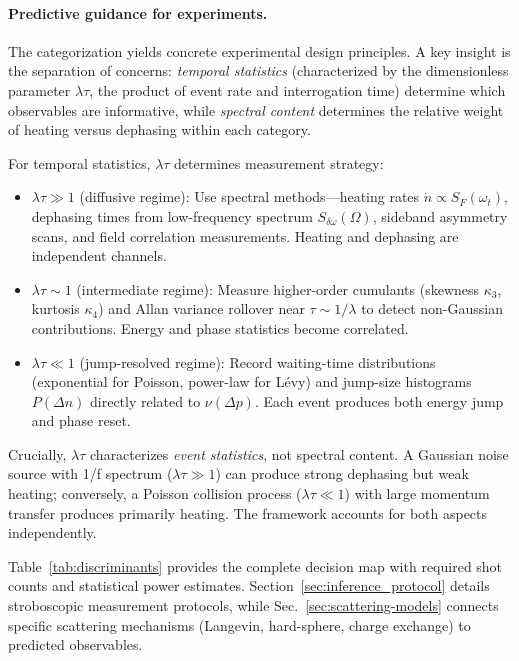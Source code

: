 \paragraph{Predictive guidance for experiments.}
The categorization yields concrete experimental design principles. A key insight is the separation of concerns: \emph{temporal statistics} (characterized by the dimensionless parameter $\lambda\tau$, the product of event rate and interrogation time) determine which observables are informative, while \emph{spectral content} determines the relative weight of heating versus dephasing within each category.

For temporal statistics, $\lambda\tau$ determines measurement strategy:
\begin{itemize}[leftmargin=*,nosep]
\item $\lambda\tau \gg 1$ (diffusive regime): Use spectral methods—heating rates $\dot{n} \propto S_F(\omega_t)$, dephasing times from low-frequency spectrum $S_{\delta\omega}(\Omega)$, sideband asymmetry scans, and field correlation measurements. Heating and dephasing are independent channels.

\item $\lambda\tau \sim 1$ (intermediate regime): Measure higher-order cumulants (skewness $\kappa_3$, kurtosis $\kappa_4$) and Allan variance rollover near $\tau \sim 1/\lambda$ to detect non-Gaussian contributions. Energy and phase statistics become correlated.

\item $\lambda\tau \ll 1$ (jump-resolved regime): Record waiting-time distributions (exponential for Poisson, power-law for L\'evy) and jump-size histograms $P(\Delta n)$ directly related to $\nu(\Delta p)$. Each event produces both energy jump and phase reset.
\end{itemize}

Crucially, $\lambda\tau$ characterizes \emph{event statistics}, not spectral content. A Gaussian noise source with 1/f spectrum ($\lambda\tau \gg 1$) can produce strong dephasing but weak heating; conversely, a Poisson collision process ($\lambda\tau \ll 1$) with large momentum transfer produces primarily heating. The framework accounts for both aspects independently.

Table~\ref{tab:discriminants} provides the complete decision map with required shot counts and statistical power estimates. Section~\ref{sec:inference_protocol} details stroboscopic measurement protocols, while Sec.~\ref{sec:scattering-models} connects specific scattering mechanisms (Langevin, hard-sphere, charge exchange) to predicted observables.

